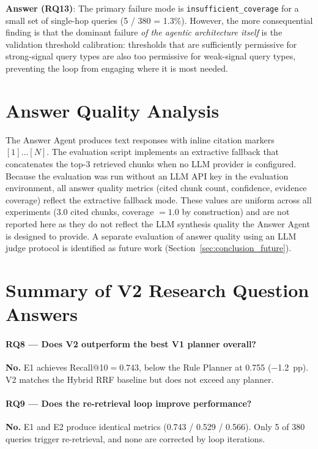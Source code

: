 \textbf{Answer (RQ13)}: The primary failure mode is \texttt{insufficient\_coverage} for a small set of single-hop queries (5 / 380 = 1.3\%). However, the more consequential finding is that the dominant failure \emph{of the agentic architecture itself} is the validation threshold calibration: thresholds that are sufficiently permissive for strong-signal query types are also too permissive for weak-signal query types, preventing the loop from engaging where it is most needed.


\section{Answer Quality Analysis}
\label{sec:v2_answer_quality}

The Answer Agent produces text responses with inline citation markers $[1]\ldots[N]$. The evaluation script implements an extractive fallback that concatenates the top-3 retrieved chunks when no LLM provider is configured. Because the evaluation was run without an LLM API key in the evaluation environment, all answer quality metrics (cited chunk count, confidence, evidence coverage) reflect the extractive fallback mode. These values are uniform across all experiments (3.0 cited chunks, coverage ${=}1.0$ by construction) and are not reported here as they do not reflect the LLM synthesis quality the Answer Agent is designed to provide. A separate evaluation of answer quality using an LLM judge protocol is identified as future work (Section~\ref{sec:conclusion_future}).


\section{Summary of V2 Research Question Answers}
\label{sec:v2_rq_summary}

\paragraph{RQ8 --- Does V2 outperform the best V1 planner overall?} \textbf{No.} E1 achieves Recall@10$={0.743}$, below the Rule Planner at 0.755 ($-$1.2~pp). V2 matches the Hybrid RRF baseline but does not exceed any planner.

\paragraph{RQ9 --- Does the re-retrieval loop improve performance?} \textbf{No.} E1 and E2 produce identical metrics (0.743 / 0.529 / 0.566). Only 5 of 380 queries trigger re-retrieval, and none are corrected by loop iterations.

